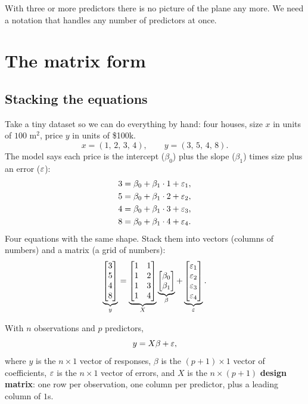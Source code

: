 With three or more predictors there is no picture of the plane any more. We need a
notation that handles any number of predictors at once.

\section{The matrix form}
\label{sec:mlr-matrix}

\subsection{Stacking the equations}

Take a tiny dataset so we can do everything by hand: four houses, size $x$ in units of
$100$ m$^2$, price $y$ in units of \$100k.
\[
  x = (1,\,2,\,3,\,4), \qquad y = (3,\,5,\,4,\,8).
\]
The model says each price is the intercept ($\beta_0$) plus the slope ($\beta_1$) times size plus an error ($\varepsilon$):
\[
\begin{aligned}
  3 &= \beta_0 + \beta_1\cdot 1 + \varepsilon_1,\\
  5 &= \beta_0 + \beta_1\cdot 2 + \varepsilon_2,\\
  4 &= \beta_0 + \beta_1\cdot 3 + \varepsilon_3,\\
  8 &= \beta_0 + \beta_1\cdot 4 + \varepsilon_4.
\end{aligned}
\]
Four equations with the same shape. Stack them into vectors (columns of numbers) and a matrix (a grid of numbers):
\[
  \underbrace{\begin{bmatrix}3\\5\\4\\8\end{bmatrix}}_{y}
  =
  \underbrace{\begin{bmatrix}1&1\\1&2\\1&3\\1&4\end{bmatrix}}_{X}
  \underbrace{\begin{bmatrix}\beta_0\\ \beta_1\end{bmatrix}}_{\beta}
  +
  \underbrace{\begin{bmatrix}\varepsilon_1\\ \varepsilon_2\\ \varepsilon_3\\ \varepsilon_4\end{bmatrix}}_{\varepsilon}.
\]

\begin{definition}
With $n$ observations and $p$ predictors,
\[
  y = X\beta + \varepsilon,
\]
where $y$ is the $n\times 1$ vector of responses, $\beta$ is the $(p+1)\times 1$ vector of
coefficients, $\varepsilon$ is the $n\times 1$ vector of errors, and $X$ is the $n\times(p+1)$
\textbf{design matrix}: one row per observation, one column per predictor, plus a
leading column of $1$s.
\end{definition}


